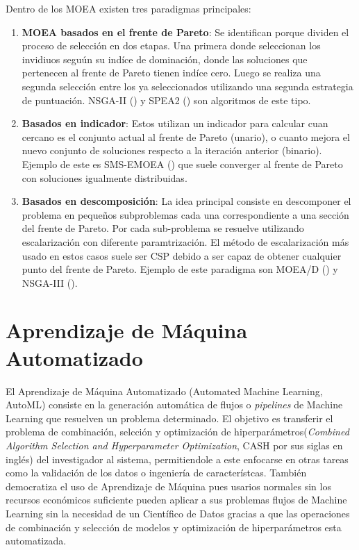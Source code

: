 Dentro de los MOEA existen tres paradigmas principales:
\begin{enumerate}
    \item \textbf{MOEA basados en el frente de Pareto}: Se identifican porque dividen el proceso de selecci\'on en dos etapas. Una primera donde seleccionan los invidiuos segu\'un su ind\'ice de dominaci\'on, donde las soluciones que pertenecen al frente de Pareto tienen ind\'ice cero. Luego se realiza una segunda selecci\'on entre los ya seleccionados utilizando una segunda estrategia de puntuaci\'on. NSGA-II (\cite{deb2002fast}) y SPEA2 (\cite{zitzler1999multiobjective}) son algoritmos de este tipo.

    \item \textbf{Basados en indicador}: Estos utilizan un indicador para calcular cuan cercano es el conjunto actual al frente de Pareto (unario), o cuanto mejora el nuevo conjunto de soluciones respecto a la iteraci\'on anterior (binario). Ejemplo de este es SMS-EMOEA (\cite{emmerich2005emo}) que suele converger al frente de Pareto con soluciones igualmente distribuidas.

    \item \textbf{Basados en descomposici\'on}: La idea principal consiste en descomponer el problema en pequeños subproblemas cada una correspondiente a una secci\'on del frente de Pareto. Por cada sub-problema se resuelve utilizando escalarizaci\'on con diferente paramtrizaci\'on. El m\'etodo de escalarizaci\'on m\'as usado en estos casos suele ser CSP debido a ser capaz de obtener cualquier punto del frente de Pareto. Ejemplo de este paradigma son MOEA/D (\cite{zhang2007moea}) y NSGA-III (\cite{deb2013evolutionary}).
\end{enumerate}


\section{Aprendizaje de M\'aquina Automatizado}
El Aprendizaje de M\'aquina Automatizado (Automated Machine Learning, AutoML) consiste en la generaci\'on autom\'atica de flujos o \textit{pipelines} de Machine Learning que resuelven un problema determinado. El objetivo es transferir el problema de combinaci\'on, selcci\'on y optimizaci\'on de hiperpar\'ametros(\textit{Combined Algorithm Selection and Hyperparameter Optimization}, CASH por sus siglas en ingl\'es) del investigador al sistema, permitiendole a este enfocarse en otras tareas como la validaci\'on de los datos o ingenier\'ia de caracter\'istcas. Tambi\'en democratiza el uso de Aprendizaje de M\'aquina pues usarios normales sin los recursos econ\'omicos suficiente pueden aplicar a sus problemas flujos de Machine Learning sin la necesidad de un Cient\'ifico de Datos gracias a que las operaciones de combinaci\'on y selecci\'on de modelos y optimizaci\'on de hiperpar\'ametros esta automatizada.

